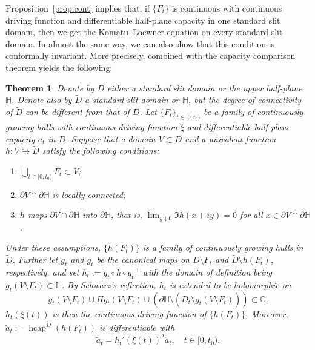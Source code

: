 \documentclass[preprint,12pt]{elsarticle}
\newtheorem{thm}{Theorem}[section]
\theoremstyle{definition}
\newcommand{\C}{\mathbb{C}}
\newcommand{\uhp}{\mathbb{H}}
\DeclareMathOperator{\hcap}{hcap}
\begin{document}
Proposition~\ref{prop:cont} implies that,
if $\{F_t\}$ is continuous with continuous driving function and
differentiable half-plane capacity in one standard slit domain,
then we get the Komatu--Loewner equation on every standard slit domain.
In almost the same way,
we can also show that this condition is conformally invariant.
More precisely, \cite[(2.7)]{LSW01} combined with
the capacity comparison theorem \cite[Theorem~A.1]{CF18} yields the following:

\begin{thm} \label{thm:hcaptrans}
Denote by $D$ either a standard slit domain or the upper half-plane $\uhp$.
Denote also by $\tilde{D}$ a standard slit domain or $\uhp$,
but the degree of connectivity of $\tilde{D}$ can be different from that of $D$.
Let $\{F_t\}_{t \in [0, t_0)}$ be a family of continuously growing hulls
with continuous driving function $\xi$ and differentiable half-plane capacity $a_t$
in $D$.
Suppose that a domain $V \subset D$ and a univalent function
$h \colon V \hookrightarrow \tilde{D}$ satisfy the following conditions:
\begin{enumerate}
\item \label{cond:inclusion} $\bigcup_{t \in [0, t_0)}F_t \subset V$;
\item $\partial V \cap \partial \uhp$ is locally connected;
\item $h$ maps $\partial V \cap \partial \uhp$ into $\partial \uhp$, that is,
$\lim_{y \downarrow 0}\Im h(x+iy)=0$ for all $x \in \partial V \cap \partial \uhp$.
\end{enumerate}
Under these assumptions,
$\{h(F_t)\}$ is a family of continuously growing hulls in $\tilde{D}$.
Further let $g_t$ and $\tilde{g}_t$ be the canonical maps on $D \setminus F_t$ and
$\tilde{D} \setminus h(F_t)$, respectively, and set
$h_t := \tilde{g}_t \circ h \circ g_t^{-1}$ with the domain of definition
being $g_t(V \setminus F_t) \subset \uhp$.
By Schwarz's reflection, $h_t$ is extended to be holomorphic on
\[
g_t(V \setminus F_t) \cup \Pi g_t(V \setminus F_t) \cup \left(\partial \uhp
\setminus (\overline{D_t \setminus g_t(V \setminus F_t)})\right)\subset \C.
\]
$h_t(\xi(t))$ is then the continuous driving function of $\{h(F_t)\}$.
Moreover, $\tilde{a}_t:=\hcap^{\tilde{D}}(h(F_t))$ is differentiable with
\begin{equation} \label{eq:hcaptrans}
\dot{\tilde{a}}_t=h_t'(\xi(t))^2\dot{a}_t, \quad t \in [0, t_0).
\end{equation}
\end{thm}
\end{document}
